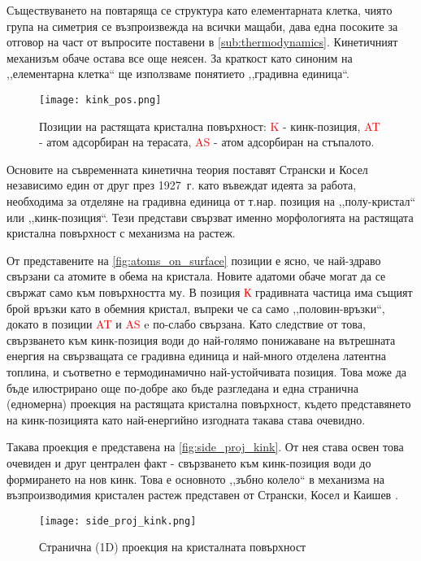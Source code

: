 Съществуването на повтаряща се структура като елементарната клетка, чиято група на симетрия се възпроизвежда на всички мащаби, дава една посоките за отговор на част от въпросите поставени в \autoref{sub:thermodynamics}. Кинетичният механизъм обаче остава все още неясен. За краткост като синоним на ,,елементарна клетка`` ще използваме понятието ,,градивна единица``.

\begin{figure}[ht]
	\centering
	\texttt{[image: kink\_pos.png]}
	\caption{Позиции на растящата кристална повърхност:  \textcolor{red}{K} - кинк-позиция, \textcolor{red}{AT} - атом адсорбиран на терасата, \textcolor{red}{AS} - атом адсорбиран на стъпалото. }
	\label{fig:atoms_on_surface}
\end{figure}

Основите на съвременната кинетична теория поставят Странски и Косел независимо един от друг през 1927~г. \cite{Stranski1928}\cite{Kossel1927} като въвеждат идеята за работа, необходима за отделяне на градивна единица от т.нар. позиция на ,,полу-кристал`` или ,,кинк-позиция``. Тези представи свързват именно морфологията на растящата кристална повърхност с механизма на растеж.

От представените на  \autoref{fig:atoms_on_surface} позиции е ясно, че най-здраво свързани са атомите в обема на кристала. Новите адатоми обаче могат да се свържат само към повърхността му. В позиция \textcolor{red}{К} градивната частица има същият брой връзки като в обемния кристал, въпреки че са само ,,половин-връзки``, докато в позиции \textcolor{red}{AT} и \textcolor{red}{AS} e по-слабо свързана. Като следствие от това, свързването към кинк-позиция води до най-голямо понижаване на вътрешната енергия на свързващата се градивна единица и най-много отделена латентна топлина, и съответно е термодинамично най-устойчивата позиция. Това може да бъде илюстрирано още по-добре ако бъде разгледана и една странична (едномерна) проекция на растящата кристална повърхност, където представянето на кинк-позицията като най-енергийно изгодната такава става очевидно.

Такава проекция е представена на \autoref{fig:side_proj_kink}. От нея става освен това очевиден и друг централен факт - свързването към кинк-позиция води до формирането на нов кинк.
Това е основното ,,зъбно колело`` в механизма на възпроизводимия кристален растеж представен от Странски, Косел и Каишев \cite{Stranski1928} \cite{Kossel1927} \cite{StranskiKaischew1931}.
\begin{figure}[H]
	\centering
	\texttt{[image: side\_proj\_kink.png]}
	\caption{Странична (1D) проекция на кристалната повърхност}
	\label{fig:side_proj_kink}
\end{figure}

